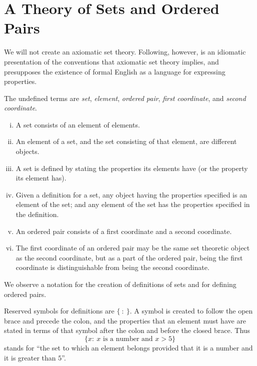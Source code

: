 \documentclass{article}
\begin{document}
\section{A Theory of Sets and Ordered Pairs}

We will not create an axiomatic set theory. Following, however, is an idiomatic presentation of the conventions that axiomatic set theory implies, and presupposes the existence of formal English as a language for expressing properties.

The undefined terms are \emph{set}, \emph{element}, \emph{ordered pair}, \emph{first coordinate}, and \emph{second coordinate}.

\begin{enumerate}[i.]
  \item A set consists of an element of elements.
  \item An element of a set, and the set consisting of that element, are different objects.
  \item A set is defined by stating the properties its elements have (or the property its element has).
  \item Given a definition for a set, any object having the properties specified is an element of the set; and any element of the set has the properties specified in the definition.
  \item An ordered pair consists of a first coordinate and a second coordinate.
  \item The first coordinate of an ordered pair may be the same set theoretic object as the second coordinate, but as a part of the ordered pair, being the first coordinate is distinguishable from being the second coordinate.
\end{enumerate}

We observe a notation for the creation of definitions of sets and for defining ordered pairs.

Reserved symbols for definitions are $\{ \ : \ \}$. A symbol is created to follow the open brace and precede the colon, and the properties that an element must have are stated in terms of that symbol after the colon and before the closed brace. Thus
\begin{equation*}
\{ x :\ x \text{ is a number and } x > 5 \}
\end{equation*}
stands for ``the set to which an element belongs provided that it is a number and it is greater than $5$''.
\end{document}
